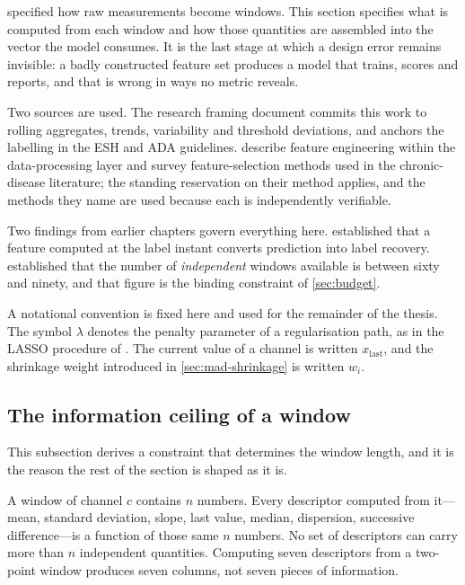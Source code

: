 \documentclass[12pt,a4paper,oneside]{report}
\begin{document}
 specified how raw measurements become windows. This section specifies what is computed from each window and how those quantities are assembled into the vector the model consumes. It is the last stage at which a design error remains invisible: a badly constructed feature set produces a model that trains, scores and reports, and that is wrong in ways no metric reveals.

Two sources are used. The research framing document commits this work to rolling aggregates, trends, variability and threshold deviations, and anchors the labelling in the ESH and ADA guidelines. \Textcite{liu2025review} describe feature engineering within the data-processing layer and survey feature-selection methods used in the chronic-disease literature; the standing reservation on their method applies, and the methods they name are used because each is independently verifiable.

Two findings from earlier chapters govern everything here.  established that a feature computed at the label instant converts prediction into label recovery.  established that the number of \emph{independent} windows available is between sixty and ninety, and that figure is the binding constraint of \cref{sec:budget}.

A notational convention is fixed here and used for the remainder of the thesis. The symbol $\lambda$ denotes the penalty parameter of a regularisation path, as in the LASSO procedure of \textcite{mendoza2025}. The current value of a channel is written $x_{\text{last}}$, and the shrinkage weight introduced in \cref{sec:mad-shrinkage} is written $w_i$.

\subsection{The information ceiling of a window}\label{sec:ceiling}

This subsection derives a constraint that determines the window length, and it is the reason the rest of the section is shaped as it is.

A window of channel $c$ contains $n$ numbers. Every descriptor computed from it---mean, standard deviation, slope, last value, median, dispersion, successive difference---is a function of those same $n$ numbers. No set of descriptors can carry more than $n$ independent quantities. Computing seven descriptors from a two-point window produces seven columns, not seven pieces of information.
\end{document}
